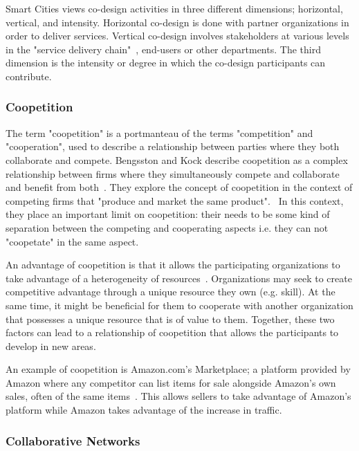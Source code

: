 Smart Cities views co-design activities in three different dimensions; horizontal, vertical, and intensity. Horizontal co-design is done with partner organizations in order to deliver services. Vertical co-design involves stakeholders at various levels in the "service delivery chain"~\cite{Cities}, end-users or other departments. The third dimension is the intensity or degree in which the co-design participants can contribute. 

\subsubsection{Coopetition}

The term "coopetition" is a portmanteau of the terms "competition" and "cooperation", used to describe a relationship between parties where they both collaborate and compete. Bengsston and Kock describe coopetition as a complex relationship between firms where they simultaneously compete and collaborate and benefit from both~\cite{Bengtsson2000}. They explore the concept of coopetition in the context of competing firms that "produce and market the same product".~\cite{Bengtsson2000} In this context, they place an important limit on coopetition: their needs to be some kind of separation between the competing and cooperating aspects i.e. they can not "coopetate" in the same aspect. 

An advantage of coopetition is that it allows the participating organizations to take advantage of a heterogeneity of resources~\cite{Bengtsson2000}. Organizations may seek to create competitive advantage through a unique resource they own (e.g. skill). At the same time, it might be beneficial for them to cooperate with another organization that possesses a unique resource that is of value to them. Together, these two factors can lead to a relationship of coopetition that allows the participants to develop in new areas. 

An example of coopetition is Amazon.com's Marketplace; a platform provided by Amazon where any  competitor can list items for sale alongside Amazon's own sales, often of the same items~\cite{UnknownAskIrina,Amazon.com}. This allows sellers to take advantage of Amazon's platform while Amazon takes advantage of the increase in traffic. 
 


\subsubsection{Collaborative Networks}

